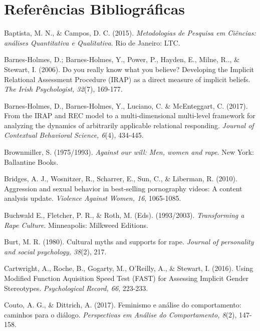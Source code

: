 \section*{Referências Bibliográficas}

\hangindent=25pt
\noindent Baptista, M. N., \& Campos, D. C. (2015). \textit{Metodologias de Pesquisa em Ciências: análises Quantitativa e Qualitativa}. Rio de Janeiro: LTC.

\hangindent=25pt
\noindent Barnes-Holmes, D.; Barnes-Holmes, Y., Power, P., Hayden, E., Milne, R.., \& Stewart, I. (2006). Do you really know what you believe? Developing the Implicit Relational Assessment Procedure (IRAP) as a direct measure of implicit beliefs. \textit{The Irish Psychologist, 32}(7), 169-177. 

\hangindent=25pt
\noindent Barnes-Holmes, D., Barnes-Holmes, Y., Luciano, C. \& McEnteggart, C. (2017). From the IRAP and REC model to a multi-dimensional multi-level framework for analyzing the dynamics of arbitrarily applicable relational responding. \textit{Journal of Contextual Behavioral Science, 6}(4), 434-445.

\hangindent=25pt
\noindent Brownmiller, S. (1975/1993). \textit{Against our will: Men, women and rape}. New York: Ballantine Books.

\hangindent=25pt
\noindent Bridges, A. J., Wosnitzer, R., Scharrer, E., Sun, C., \& Liberman, R. (2010). Aggression and sexual behavior in best-selling pornography videos: A content analysis update. \textit{Violence Against Women, 16}, 1065-1085.

\hangindent=25pt
\noindent Buchwald E., Fletcher, P. R., \& Roth, M. (Eds). (1993/2003). \textit{Transforming a Rape Culture}. Minneapolis: Milkweed Editions.

\hangindent=25pt
\noindent Burt, M. R. (1980). Cultural myths and supports for rape. \textit{Journal of personality and social psychology, 38}(2), 217.

\hangindent=25pt
\noindent Cartwright, A., Roche, B., Gogarty, M., O'Reilly, A., \& Stewart, I. (2016). Using Modified Function Aquisition Speed Test (FAST) for Assessing Implicit Gender Stereotypes. \textit{Psychological Record, 66}, 223-233.

\hangindent=25pt
\noindent Couto, A. G., \& Dittrich, A. (2017). Feminismo e análise do comportamento: caminhos para o diálogo. \textit{Perspectivas em Análise do Comportamento, 8}(2), 147-158.

